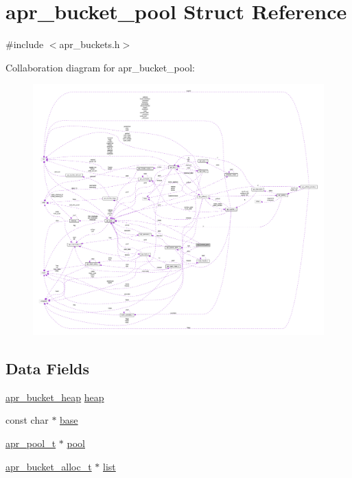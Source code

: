 \hypertarget{structapr__bucket__pool}{}\section{apr\+\_\+bucket\+\_\+pool Struct Reference}
\label{structapr__bucket__pool}


{\ttfamily \#include $<$apr\+\_\+buckets.\+h$>$}



Collaboration diagram for apr\+\_\+bucket\+\_\+pool\+:
\nopagebreak
\begin{figure}[H]
\begin{center}
\leavevmode
\includegraphics[width=350pt]{structapr__bucket__pool__coll__graph}
\end{center}
\end{figure}
\subsection*{Data Fields}
\begin{DoxyCompactItemize}
\item 
\hyperlink{structapr__bucket__heap}{apr\+\_\+bucket\+\_\+heap} \hyperlink{structapr__bucket__pool_a0fe0b0dedea28fb1ed0a1a0f42338225}{heap}
\item 
const char $\ast$ \hyperlink{structapr__bucket__pool_a9ee5297361ba548a20c3aa626a37c068}{base}
\item 
\hyperlink{structapr__pool__t}{apr\+\_\+pool\+\_\+t} $\ast$ \hyperlink{structapr__bucket__pool_af55591a1e7f3b097e7c271683bc80968}{pool}
\item 
\hyperlink{structapr__bucket__alloc__t}{apr\+\_\+bucket\+\_\+alloc\+\_\+t} $\ast$ \hyperlink{structapr__bucket__pool_a651aa0c18658342daf72ff86680bfaca}{list}
\end{DoxyCompactItemize}


